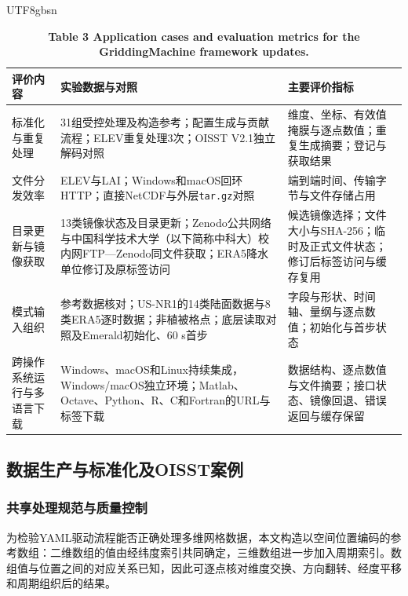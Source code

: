 \documentclass[numdoi]{chinese}
\newlength{\gmTableWidth}
\begin{document}
\begin{CJK}{UTF8}{gbsn}
\begin{table}[!htbp]\centering
\begingroup\singlespacing\small\setlength{\tabcolsep}{9pt}\renewcommand{\arraystretch}{1.12}
\captionsetup{justification=centering}
\setlength{\gmTableWidth}{\dimexpr\linewidth-4\tabcolsep\relax}
\caption*{\textbf{表3 GriddingMachine框架更新的应用案例与评价指标}}
\caption*{\textbf{Table 3 Application cases and evaluation metrics for the GriddingMachine framework updates.}}
\begin{tabular}{@{}>{\raggedright\arraybackslash}p{0.18\gmTableWidth}>{\raggedright\arraybackslash}p{0.46\gmTableWidth}>{\raggedright\arraybackslash}p{0.36\gmTableWidth}@{}}
\toprule
\textbf{评价内容} & \textbf{实验数据与对照} & \textbf{主要评价指标} \\
\midrule
标准化与重复处理 & 31组受控处理及构造参考；配置生成与贡献流程；ELEV重复处理3次；OISST V2.1独立解码对照 & 维度、\allowbreak{}坐标、\allowbreak{}有效值掩膜与逐点数值；重复生成摘要；登记与获取结果 \\
\midrule[0.25pt]
文件分发效率 & ELEV与LAI；Windows和macOS回环HTTP；直接NetCDF与外层\nolinkurl{tar.gz}对照 & 端到端时间、\allowbreak{}传输字节与文件存储占用 \\
\midrule[0.25pt]
目录更新与镜像获取 & 13类镜像状态及目录更新；Zenodo公共网络与中国科学技术大学（以下简称中科大）校内网FTP—Zenodo同文件获取；ERA5降水单位修订及原标签访问 & 候选镜像选择；文件大小与SHA-256；临时及正式文件状态；修订后标签访问与缓存复用 \\
\midrule[0.25pt]
模式输入组织 & 参考数据核对；US-NR1的14类陆面数据与8类ERA5逐时数据；非植被格点；底层读取对照及Emerald初始化、\allowbreak{}60 s首步 & 字段与形状、\allowbreak{}时间轴、\allowbreak{}量纲与逐点数值；初始化与首步状态 \\
\midrule[0.25pt]
跨操作系统运行与多语言下载 & Windows、\allowbreak{}macOS和Linux持续集成，Windows/macOS独立环境；Matlab、\allowbreak{}Octave、\allowbreak{}Python、\allowbreak{}R、\allowbreak{}C和Fortran的URL与标签下载 & 数据结构、\allowbreak{}逐点数值与文件摘要；接口状态、\allowbreak{}镜像回退、\allowbreak{}错误返回与缓存保留 \\
\bottomrule
\end{tabular}
\endgroup
\label{tab:3}
\end{table}
\FloatBarrier
\subsection{数据生产与标准化及OISST案例}
\subsubsection{共享处理规范与质量控制}
为检验YAML驱动流程能否正确处理多维网格数据，本文构造以空间位置编码的参考数组：二维数组的值由经纬度索引共同确定，三维数组进一步加入周期索引。数组值与位置之间的对应关系已知，因此可逐点核对维度交换、方向翻转、经度平移和周期组织后的结果。


\end{CJK}
\end{document}
